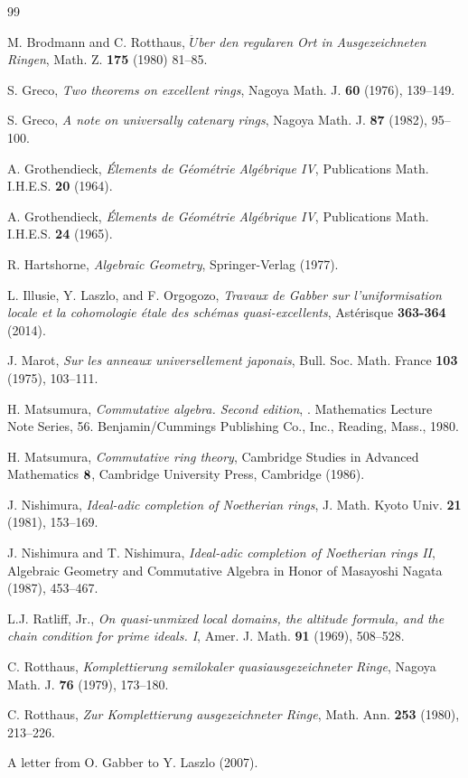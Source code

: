 \documentclass[11pt,a4paper]{amsart}
\theoremstyle{definition}
\theoremstyle{remark}
\begin{document}
\begin{thebibliography}{99}


M. Brodmann and C. Rotthaus, \emph{$\ddot{U}$ber den regul$\ddot{a}$ren Ort in Ausgezeichneten Ringen}, Math. Z. {\bf175} (1980) 81--85.



S. Greco, \emph{Two theorems on excellent rings}, Nagoya Math. J. 
{\bf60} (1976), 139--149.


S. Greco, \emph{A note on universally catenary rings}, Nagoya Math. J. {\bf 87} (1982), 95--100.


A. Grothendieck, \emph{\'Elements de G\'eom\'etrie Alg\'ebrique IV},
Publications Math. I.H.E.S. {\bf 20} (1964).

A. Grothendieck, \emph{\'Elements de G\'eom\'etrie Alg\'ebrique IV},
Publications Math. I.H.E.S. {\bf 24} (1965).


R. Hartshorne, \emph{Algebraic Geometry}, Springer-Verlag (1977).



L. Illusie, Y. Laszlo, and F. Orgogozo, \emph{Travaux de Gabber sur l'uniformisation locale et la cohomologie \'etale des sch\'emas quasi-excellents}, Ast\'erisque {\bf363-364}  (2014).



J. Marot, \emph{Sur les anneaux universellement japonais}, Bull. Soc. Math. France {\bf103} (1975), 103--111. 


H. Matsumura, \emph{Commutative algebra. Second edition}, .
Mathematics Lecture Note Series, 56. Benjamin/Cummings Publishing Co., Inc., Reading, Mass., 1980.


H. Matsumura, \emph{Commutative ring theory}, Cambridge
Studies in Advanced Mathematics $\bf{8}$, Cambridge University Press, Cambridge (1986).


J. Nishimura, \emph{Ideal-adic completion of Noetherian rings}, J. Math. Kyoto Univ. {\bf 21} (1981), 153--169.



J. Nishimura and T. Nishimura, \emph{Ideal-adic completion of Noetherian rings II}, Algebraic Geometry and Commutative Algebra in Honor of Masayoshi Nagata (1987), 453--467.


L.J. Ratliff, Jr., \emph{On quasi-unmixed local domains, the altitude formula, and the chain condition for prime ideals. I}, 
Amer. J. Math.  {\bf 91} (1969), 508--528.


C. Rotthaus, \emph{Komplettierung semilokaler quasiausgezeichneter Ringe},
Nagoya Math. J.  {\bf 76}  (1979), 173--180.


C. Rotthaus, \emph{Zur Komplettierung ausgezeichneter Ringe},
Math. Ann. {\bf 253}  (1980), 213--226.


A letter from O. Gabber to Y. Laszlo (2007). 








\end{thebibliography}
\end{document}
